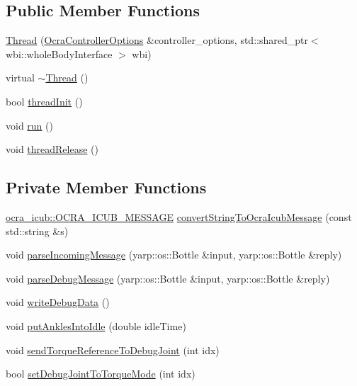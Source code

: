 \subsection*{\-Public \-Member \-Functions}
\begin{DoxyCompactItemize}
\item 
\hyperlink{classThread_a7494a3cf676527432ee724d59ed9ee8f}{\-Thread} (\hyperlink{classOcraControllerOptions}{\-Ocra\-Controller\-Options} \&controller\-\_\-options, std\-::shared\-\_\-ptr$<$ wbi\-::whole\-Body\-Interface $>$ wbi)
\item 
virtual \hyperlink{classThread_a37d9edd3a1a776cbc27dedff949c9726}{$\sim$\-Thread} ()
\item 
bool \hyperlink{classThread_a1e840470cd71d7bfb2430d24169e3dce}{thread\-Init} ()
\item 
void \hyperlink{classThread_ad9373d8d725c46717dfce3130018fe3a}{run} ()
\item 
void \hyperlink{classThread_aa2856c7d45670f45d66bcb319255defe}{thread\-Release} ()
\end{DoxyCompactItemize}
\subsection*{\-Private \-Member \-Functions}
\begin{DoxyCompactItemize}
\item 
\hyperlink{namespaceocra__icub_afbd2db66b68005fb7cfac19210caf83f}{ocra\-\_\-icub\-::\-O\-C\-R\-A\-\_\-\-I\-C\-U\-B\-\_\-\-M\-E\-S\-S\-A\-G\-E} \hyperlink{classThread_a2c64d83df66f7168d34993b76a179dde}{convert\-String\-To\-Ocra\-Icub\-Message} (const std\-::string \&s)
\item 
void \hyperlink{classThread_ae21029d250ac7c720f2411eab71a9414}{parse\-Incoming\-Message} (yarp\-::os\-::\-Bottle \&input, yarp\-::os\-::\-Bottle \&reply)
\item 
void \hyperlink{classThread_a6ce5ef9684cb2793be85e7402ad672f0}{parse\-Debug\-Message} (yarp\-::os\-::\-Bottle \&input, yarp\-::os\-::\-Bottle \&reply)
\item 
void \hyperlink{classThread_a9af0e98aa9b1de2f5c7bfa2f6e5001a2}{write\-Debug\-Data} ()
\item 
void \hyperlink{classThread_a4b79627dd26cfff3873f2805f49f2873}{put\-Ankles\-Into\-Idle} (double idle\-Time)
\item 
void \hyperlink{classThread_abb40b80d01d71d1aea1f787f7a1a2511}{send\-Torque\-Reference\-To\-Debug\-Joint} (int idx)
\item 
bool \hyperlink{classThread_acc470c4c98aac74a1b550a4afacb322f}{set\-Debug\-Joint\-To\-Torque\-Mode} (int idx)
\end{DoxyCompactItemize}
